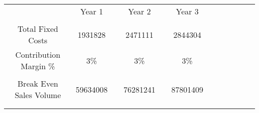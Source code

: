 {\begin{longtable}[c]{|c|c|c|c|c|c|c|c|c|c|c|c|}
\hline
                                                                                                                                &                                   &  &              &  &           &  &           &  &           &  &           \\
\hline
                                                                                                                                & Year 1                            &  & Year 2       &  & Year 3    &  &           &  &           &  &           \\
\hline
                                                                                                                                &                                   &  &              &  &           &  &           &  &           &  &           \\
\hline
Total Fixed Costs                                                                                                               & 1931828                           &  & 2471111      &  & 2844304   &  &           &  &           &  &           \\
\hline
Contribution Margin \%                                                                                                           & 3\%                                &  & 3\%           &  & 3\%        &  &           &  &           &  &           \\
\hline
                                                                                                                                &                                   &  &              &  &           &  &           &  &           &  &           \\
\hline
Break Even Sales Volume                                                                                                         & 59634008                          &  & 76281241     &  & 87801409  &  &           &  &           &  &           \\
\hline
                                                                                                                                &                                   &  &              &  &           &  &           &  &           &  &           \\
\hline
                                                                                                                                &                                   &  &              &  &           &  &           &  &           &  &           \\

\end{longtable}}
